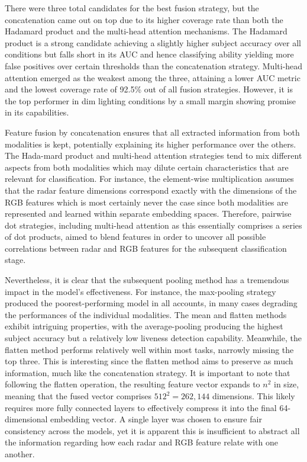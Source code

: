 \documentclass{mpaper}
\begin{document}
There were three total candidates for the best fusion strategy, but the concatenation came out on top due to its higher coverage rate than both the Hadamard product and the multi-head attention mechanisms. The Hadamard product is a strong candidate achieving a slightly higher subject accuracy over all conditions but falls short in its AUC and hence classifying ability yielding more false positives over certain thresholds than the concatenation strategy. Multi-head attention emerged as the weakest among the three, attaining a lower AUC metric and the lowest coverage rate of 92.5\% out of all fusion strategies. However, it is the top performer in dim lighting conditions by a small margin showing promise in its capabilities. 

Feature fusion by concatenation ensures that all extracted information from both modalities is kept, potentially explaining its higher performance over the others. The Hada-mard product and multi-head attention strategies tend to mix different aspects from both modalities which may dilute certain characteristics that are relevant for classification. For instance, the element-wise multiplication assumes that the radar feature dimensions correspond exactly with the dimensions of the RGB features which is most certainly never the case since both modalities are represented and learned within separate embedding spaces. Therefore, pairwise dot strategies, including multi-head attention as this essentially comprises a series of dot products, aimed to blend features in order to uncover all possible correlations between radar and RGB features for the subsequent classification stage.

Nevertheless, it is clear that the subsequent pooling method has a tremendous impact in the model's effectiveness. For instance, the max-pooling strategy produced the poorest-performing model in all accounts, in many cases degrading the performances of the individual modalities. The mean and flatten methods exhibit intriguing properties, with the average-pooling producing the highest subject accuracy but a relatively low liveness detection capability. Meanwhile, the flatten method performs relatively well within most tasks, narrowly missing the top three. This is interesting since the flatten method aims to preserve as much information, much like the concatenation strategy. It is important to note that following the flatten operation, the resulting feature vector expands to $n^2$ in size, meaning that the fused vector comprises $512^2 = 262,144$ dimensions. This likely requires more fully connected layers to effectively compress it into the final 64-dimensional embedding vector. A single layer was chosen to ensure fair consistency across the models, yet it is apparent this is insufficient to abstract all the information regarding how each radar and RGB feature relate with one another.
\end{document}
